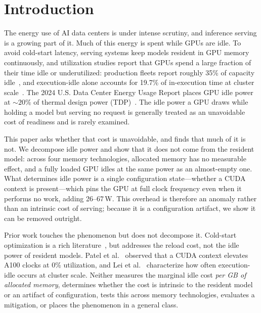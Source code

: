 \documentclass[conference]{IEEEtran}
\begin{document}
\section{Introduction}
The energy use of AI data centers is under intense scrutiny, and inference serving is a growing part of it. Much of this energy is spent while GPUs are idle. To avoid cold-start latency, serving systems keep models resident in GPU memory continuously, and utilization studies report that GPUs spend a large fraction of their time idle or underutilized: production fleets report roughly 35\% of capacity idle~\cite{flexera}, and execution-idle alone accounts for 19.7\% of in-execution time at cluster scale~\cite{lei-idle}. The 2024 U.S. Data Center Energy Usage Report places GPU idle power at ${\sim}20\%$ of thermal design power (TDP)~\cite{doe-report}. The idle power a GPU draws while holding a model but serving no request is generally treated as an unavoidable cost of readiness and is rarely examined.

This paper asks whether that cost is unavoidable, and finds that much of it is not. We decompose idle power and show that it does not come from the resident model: across four memory technologies, allocated memory has no measurable effect, and a fully loaded GPU idles at the same power as an almost-empty one. What determines idle power is a single configuration state---whether a CUDA context is present---which pins the GPU at full clock frequency even when it performs no work, adding 26--67\,W. This overhead is therefore an anomaly rather than an intrinsic cost of serving; because it is a configuration artifact, we show it can be removed outright.

Prior work touches the phenomenon but does not decompose it. Cold-start optimization is a rich literature~\cite{serverlessllm,nvidia-streamer,hydraserve,lambdascale}, but addresses the reload cost, not the idle power of resident models. Patel et al.~\cite{patel-cal23} observed that a CUDA context elevates A100 clocks at 0\% utilization, and Lei et al.~\cite{lei-idle} characterize how often execution-idle occurs at cluster scale. Neither measures the marginal idle cost \emph{per GB of allocated memory}, determines whether the cost is intrinsic to the resident model or an artifact of configuration, tests this across memory technologies, evaluates a mitigation, or places the phenomenon in a general class.
\end{document}
